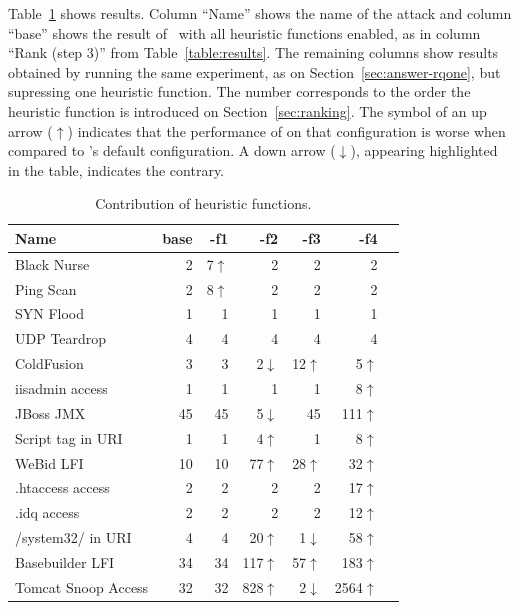 \documentclass[sigconf,review, anonymous]{acmart}
\begin{document}
Table~\ref{table:weights} shows results. Column ``Name'' shows the
name of the attack and column ``base'' shows the result of
\tname\ with all heuristic functions enabled, as in column ``Rank
(step 3)'' from Table~\ref{table:results}. The remaining columns show
results obtained by running the same experiment, as on
Section~\ref{sec:answer-rqone}, but supressing one heuristic
function. The number corresponds to the order the heuristic function
is introduced on Section~\ref{sec:ranking}. The symbol of an up arrow
($\uparrow$) indicates that the performance of \tname{} on that
configuration is worse when compared to \tname's default
configuration. A down arrow ($\downarrow$), appearing highlighted in
the table, indicates the contrary.

\setlength{\tabcolsep}{5pt}
\begin{table}[h!]
  \small
  \caption{\label{table:weights}Contribution of heuristic functions.}
  \vspace{-2ex}
  \centering
  \begin{tabular}{lrrrrrr}
    \toprule
    Name &
    base &
    -f1 &
    -f2 &    
    -f3 &
    -f4 \\
    \midrule
    Black Nurse & 2 & 7$\uparrow$ & 2 & 2 & 2 \\    
    Ping Scan & 2 &  8$\uparrow$& 2 & 2 & 2 \\
    SYN Flood & 1 & 1 & 1 & 1 & 1 \\
    UDP Teardrop & 4 & 4 & 4 & 4 & 4 \\
    \midrule
    ColdFusion & 3 & 3 & 2\cellcolor{lightgray}$\downarrow$ & 12$\uparrow$ & 5$\uparrow$ \\
    iisadmin access & 1  & 1 & 1 & 1 & 8$\uparrow$\\        
    JBoss JMX & 45 & 45 & 5\cellcolor{lightgray}$\downarrow$ & 45 & 111$\uparrow$ \\
    Script tag in URI & 1 & 1 & 4$\uparrow$ & 1 & 8$\uparrow$ \\
    WeBid LFI & 10 & 10 & 77$\uparrow$ & 28$\uparrow$ & 32$\uparrow$ \\    
    .htaccess access & 2  & 2 & 2 & 2 & 17$\uparrow$\\
    .idq access & 2  & 2 & 2 & 2 & 12$\uparrow$ \\
    /system32/ in URI & 4  & 4 & 20$\uparrow$ & 1\cellcolor{lightgray}$\downarrow$ & 58$\uparrow$\\
    Basebuilder LFI & 34  & 34 & 117$\uparrow$ & 57$\uparrow$ & 183$\uparrow$\\
    Tomcat Snoop Access & 32  & 32 & 828$\uparrow$ & 2\cellcolor{lightgray}$\downarrow$ & 2564$\uparrow$\\
    \bottomrule
  \end{tabular}
\end{table}
\end{document}

